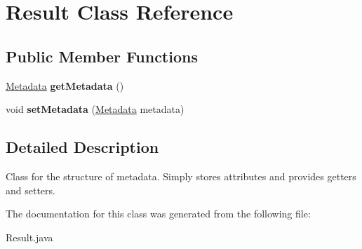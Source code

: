 \hypertarget{class_result}{}\section{Result Class Reference}
\label{class_result}
\subsection*{Public Member Functions}
\begin{DoxyCompactItemize}
\item 
\mbox{\label{class_result_aa110bdc3eb370ca28286a71d28bdfe4c}} 
\hyperlink{class_metadata}{Metadata} {\bfseries get\+Metadata} ()
\item 
\mbox{\label{class_result_a31ac8dccff4ed8d6b0a6e3a21c5d672a}} 
void {\bfseries set\+Metadata} (\hyperlink{class_metadata}{Metadata} metadata)
\end{DoxyCompactItemize}


\subsection{Detailed Description}
Class for the structure of metadata. Simply stores attributes and provides getters and setters. 

The documentation for this class was generated from the following file\+:\begin{DoxyCompactItemize}
\item 
Result.\+java\end{DoxyCompactItemize}
